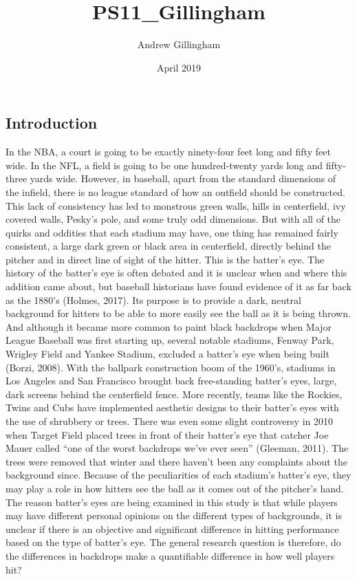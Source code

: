 \documentclass{article}
\title{PS11_Gillingham}
\author{Andrew Gillingham }
\date{April 2019}
\begin{document}
\maketitle
\begin{doublespace}
\section{Introduction}
In the NBA, a court is going to be exactly ninety-four feet long and fifty feet wide. In the NFL, a field is going to be one hundred-twenty yards long and fifty-three yards wide. However, in baseball, apart from the standard dimensions of the infield, there is no league standard of how an outfield should be constructed. This lack of consistency has led to monstrous green walls, hills in centerfield, ivy covered walls, Pesky’s pole, and some truly odd dimensions. But with all of the quirks and oddities that each stadium may have, one thing has remained fairly consistent, a large dark green or black area in centerfield, directly behind the pitcher and in direct line of sight of the hitter. This is the batter’s eye. 
The history of the batter’s eye is often debated and it is unclear when and where this addition came about, but baseball historians have found evidence of it as far back as the 1880’s (Holmes, 2017). Its purpose is to provide a dark, neutral background for hitters to be able to more easily see the ball as it is being thrown. And although it became more common to paint black backdrops when Major League Baseball was first starting up, several notable stadiums, Fenway Park, Wrigley Field and Yankee Stadium, excluded a batter’s eye when being built (Borzi, 2008). With the ballpark construction boom of the 1960’s, stadiums in Los Angeles and San Francisco brought back free-standing batter’s eyes, large, dark screens behind the centerfield fence. More recently, teams like the Rockies, Twins and Cubs have implemented aesthetic designs to their batter’s eyes with the use of shrubbery or trees. There was even some slight controversy in 2010 when Target Field placed trees in front of their batter’s eye that catcher Joe Mauer called “one of the worst backdrops we’ve ever seen” (Gleeman, 2011). The trees were removed that winter and there haven’t been any complaints about the background since. Because of the peculiarities of each stadium’s batter’s eye, they may play a role in how hitters see the ball as it comes out of the pitcher’s hand. The reason batter’s eyes are being examined in this study is that while players may have different personal opinions on the different types of backgrounds, it is unclear if there is an objective and significant difference in hitting performance based on the type of batter’s eye. The general research question is therefore, do the differences in backdrops make a quantifiable difference in how well players hit?


\end{doublespace}
\end{document}
